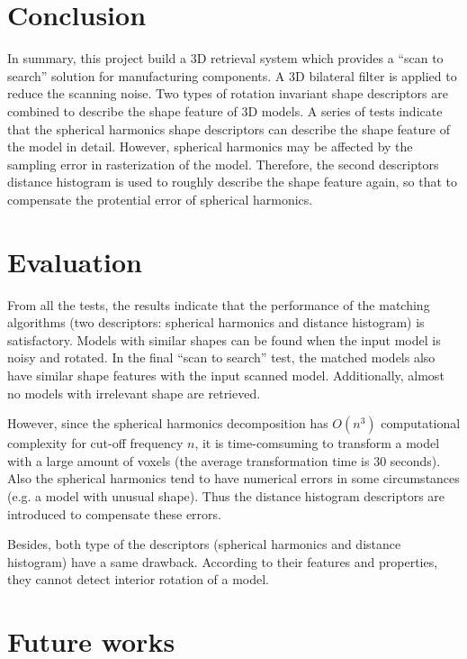 \section{Conclusion}

In summary, this project build a 3D retrieval system which provides a ``scan to search'' solution for manufacturing components. A 3D bilateral filter is applied to reduce the scanning noise. Two types of rotation invariant shape descriptors are combined to describe the shape feature of 3D models. A series of tests indicate that the spherical harmonics shape descriptors can describe the shape feature of the model in detail. However, spherical harmonics may be affected by the sampling error in rasterization of the model. Therefore, the second descriptors distance histogram is used to roughly describe the shape feature again, so that to compensate the protential error of spherical harmonics. 

\section{Evaluation}

From all the tests, the results indicate that the performance of the matching algorithms (two descriptors: spherical harmonics and distance histogram) is satisfactory. Models with similar shapes can be found when the input model is noisy and rotated. In the final ``scan to search'' test, the matched models also have similar shape features with the input scanned model. Additionally, almost no models with irrelevant shape are retrieved. 

However, since the spherical harmonics decomposition has $O(n^3)$ computational complexity for cut-off frequency $n$, it is time-comsuming to transform a model with a large amount of voxels (the average transformation time is 30 seconds). Also the spherical harmonics tend to have numerical errors in some circumstances (e.g. a model with unusual shape). Thus the distance histogram descriptors are introduced to compensate these errors. 

Besides, both type of the descriptors (spherical harmonics and distance histogram) have a same drawback. According to their features and properties, they cannot detect interior rotation of a model. 

\section{Future works}

